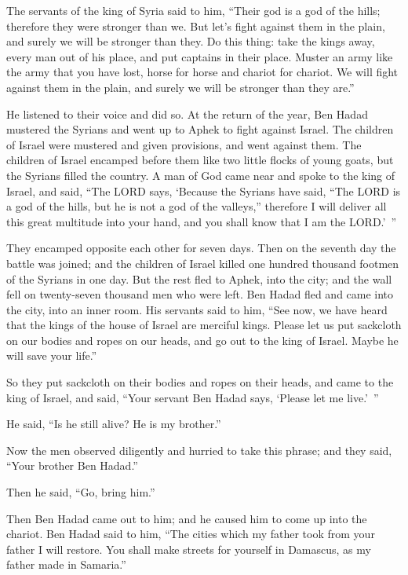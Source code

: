 \myverse{}The servants of the king of Syria said to him, “Their god is
a god of the hills; therefore they were stronger than we. But let’s fight against them in the plain, and
surely we will be stronger than they.
\myverse{}Do this thing: take the kings away, every man out of his place, and put captains
in their place.
\myverse{}Muster an army like the army that you have lost, horse for horse and chariot
for chariot. We will fight against them in the plain, and surely we will be stronger than they are.”

He listened to their voice and did so.
\myverse{}At the return of the year, Ben Hadad mustered the Syrians and went up to
Aphek to fight against Israel.
\myverse{}The children of Israel were mustered and given provisions, and went against
them. The children of Israel encamped before them like two little flocks of young goats, but the Syrians
filled the country.
\myverse{}A man of God came near and spoke to the king of Israel, and said, “The LORD
says, ‘Because the Syrians have said, “The LORD is a god of the hills, but he is not a god of the valleys,”
therefore I will deliver all this great multitude into your hand, and you shall know that I am the LORD.’ ”

\myverse{}They encamped opposite each other for seven days. Then on the
seventh day the battle was joined; and the children of Israel killed one hundred thousand footmen of the
Syrians in one day.
\myverse{}But the rest fled to Aphek, into the city; and the wall fell on twenty-seven
thousand men who were left. Ben Hadad fled and came into the city, into an inner room.
\myverse{}His servants said to him, “See now, we have heard that the kings of the house
of Israel are merciful kings. Please let us put sackcloth on our bodies and ropes on our heads, and go
out to the king of Israel. Maybe he will save your life.”

\myverse{}So they put sackcloth on their bodies and ropes on their heads,
and came to the king of Israel, and said, “Your servant Ben Hadad says, ‘Please let me live.’ ”

He said, “Is he still alive? He is my brother.”

\myverse{}Now the men observed diligently and hurried to take this phrase;
and they said, “Your brother Ben Hadad.”

Then he said, “Go, bring him.”

Then Ben Hadad came out to him; and he caused him to come up into the chariot.
\myverse{}Ben Hadad said to him, “The cities which my father took from your father
I will restore. You shall make streets for yourself in Damascus, as my father made in Samaria.”

